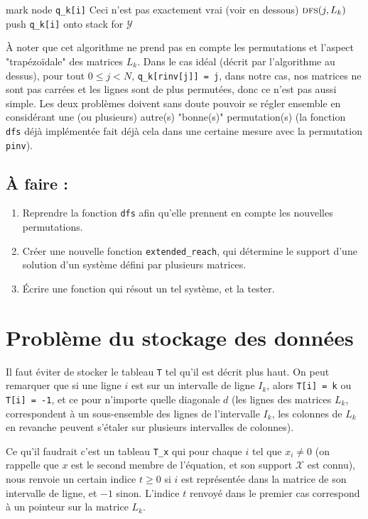 \documentclass{article}
\begin{document}
\begin{algorithmic}
\State mark node \verb$q_k[i]$ \Comment Ceci n'est pas exactement vrai (voir en dessous)
\State $\textsc{dfs}(j, L_k)$
\EndIf
\State push \verb$q_k[i]$ onto stack for $\mathcal{Y}$
\EndFor
\EndProcedure
\end{algorithmic}

À noter que cet algorithme ne prend pas en compte les permutations et l'aspect "trapézoïdale" des matrices $L_k$.
Dans le cas idéal (décrit par l'algorithme au dessus), pour tout $0 \leq j < N$, \verb$q_k[rinv[j]] = j$, dans notre cas, nos matrices ne sont pas carrées et les lignes sont de plus permutées, donc ce n'est pas aussi simple.
Les deux problèmes doivent sans doute pouvoir se régler ensemble en considérant une (ou plusieurs) autre(s) "bonne(s)" permutation(s) (la fonction \verb$dfs$ déjà implémentée fait déjà cela dans une certaine mesure avec la permutation \verb$pinv$). 

\subsection{À faire :} 
\begin{enumerate}
\item Reprendre la fonction \verb$dfs$ afin qu'elle prennent en compte les nouvelles permutations.
\item Créer une nouvelle fonction \verb$extended_reach$, qui détermine le support d'une solution d'un système défini par plusieurs matrices.
\item Écrire une fonction qui résout un tel système, et la tester.
\end{enumerate}

\section{Problème du stockage des données}

Il faut éviter de stocker le tableau \verb$T$ tel qu'il est décrit plus haut. On peut remarquer que si une ligne $i$ est sur un intervalle de ligne $I_k$, alors \verb$T[i] = k$ ou \verb$T[i] = -1$, et ce pour n'importe quelle diagonale $d$ (les lignes des matrices $L_k$, correspondent à un sous-ensemble des lignes de l'intervalle $I_k$, les colonnes de $L_k$ en revanche peuvent s'étaler sur plusieurs intervalles de colonnes).

Ce qu'il faudrait c'est un tableau \verb$T_x$ qui pour chaque $i$ tel que $x_i \not= 0$ (on rappelle que $x$ est le second membre de l'équation, et son support $\mathcal{X}$ est connu), nous renvoie un certain indice $t \geq 0$ si $i$ est représentée dans la matrice de son intervalle de ligne, et $-1$ sinon.
L'indice $t$ renvoyé dans le premier cas correspond à un pointeur sur la matrice $L_k$.
\end{document}
